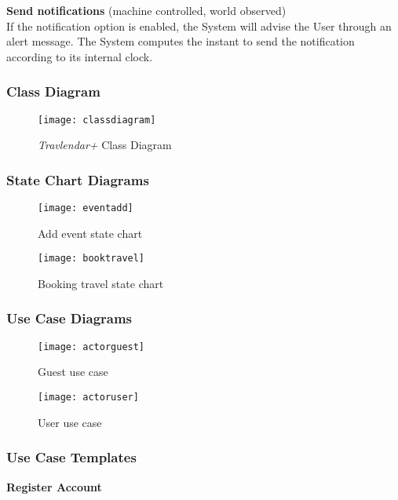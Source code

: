 \noindent
\textbf{Send notifications} (machine controlled, world observed)\\
If the notification option is enabled, the System will advise the User through an alert message. The System computes the instant to send the notification according to its internal clock.\\

\subsubsection{Class Diagram}

\begin{figure}[H]
	\centering
	\texttt{[image: classdiagram]}
	\caption{\textit{Travlendar+} Class Diagram}
\end{figure}

\subsubsection{State Chart Diagrams}

\begin{figure}[H]
	\centering
	\texttt{[image: eventadd]}
	\caption{Add event state chart}
\end{figure}

\begin{figure}[H]
	\centering
	\texttt{[image: booktravel]}
	\caption{Booking travel state chart}
\end{figure}

\newpage
\subsubsection{Use Case Diagrams}

\begin{figure}[H]
	\centering
	\texttt{[image: actorguest]}
	\caption{Guest use case}
\end{figure}

\begin{figure}[H]
	
	\centering
	\texttt{[image: actoruser]}
	\caption{User use case}
\end{figure}

\newpage
\subsubsection{Use Case Templates}
\begin{center}
	\textbf{Register Account}
\end{center}

